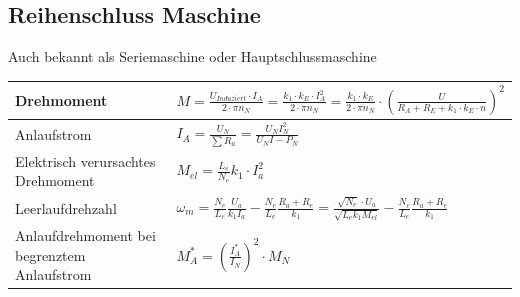     \subsection{Reihenschluss Maschine}
    Auch bekannt als Seriemaschine oder Hauptschlussmaschine\\
        \renewcommand{\arraystretch}{2}
        \begin{tabular}[c]{ | p{6cm} | p{9cm} |}
            \hline
            Drehmoment &
            $ M=  \frac{U_{Induziert} \cdot I_A}{2 \cdot \pi n_N} = \frac{k_1 \cdot k_E \cdot I_A ^2}{2\cdot \pi n_N}= \frac{k_1 \cdot k_E}{2 \cdot \pi n_N}\cdot(\frac{U}{R_A + R_E + k_1 \cdot k_E \cdot n})^2$ \\
            \hline
            Anlaufstrom &
            $I_A=\frac{U_N}{\sum R_a}=\frac{U_N I_N^2}{U_N I-P_N}$ \\
            \hline
            Elektrisch verursachtes Drehmoment & $M_{el}=\frac{L_e}{N_e}k_1\cdot I_a^2$\\
            \hline
            Leerlaufdrehzahl &
            $\omega_m=\frac{N_e}{L_e}\frac{U_a}{k_1I_a}-\frac{N_e}{L_e}\frac{R_a+R_e}{k_1}=\frac{\sqrt{N_e}\cdot
            U_a}{\sqrt{L_ek_1M_{el}}}-\frac{N_e}{L_e}\frac{R_a+R_e}{k_1}$\\
            \hline
            Anlaufdrehmoment bei begrenztem Anlaufstrom & $M^*_A = (\frac{I^*_A}{I_N})^2 \cdot M_N$ \\ \hline
        \end{tabular}
        \renewcommand{\arraystretch}{1.5}